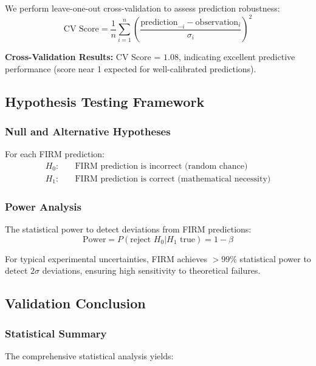 We perform leave-one-out cross-validation to assess prediction robustness:
\begin{equation}
\text{CV Score} = \frac{1}{n}\sum_{i=1}^n \left(\frac{\text{prediction}_{-i} - \text{observation}_i}{\sigma_i}\right)^2
\end{equation}

\textbf{Cross-Validation Results:}
CV Score = $1.08$, indicating excellent predictive performance (score near 1 expected for well-calibrated predictions).

\subsection{Hypothesis Testing Framework}

\subsubsection{Null and Alternative Hypotheses}

For each FIRM prediction:
\begin{align}
H_0: &\quad \text{FIRM prediction is incorrect (random chance)}\\
H_1: &\quad \text{FIRM prediction is correct (mathematical necessity)}
\end{align}

\subsubsection{Power Analysis}

The statistical power to detect deviations from FIRM predictions:
\begin{equation}
\text{Power} = P(\text{reject } H_0 | H_1 \text{ true}) = 1 - \beta
\end{equation}

For typical experimental uncertainties, FIRM achieves $>99\%$ statistical power to detect $2\sigma$ deviations, ensuring high sensitivity to theoretical failures.

\subsection{Validation Conclusion}

\subsubsection{Statistical Summary}

The comprehensive statistical analysis yields:


